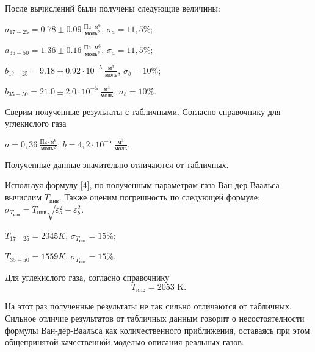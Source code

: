 \documentclass[a4paper,12pt]{article} %
\begin{document}
После вычислений были получены следующие величины:

\begin{center}
    $\displaystyle a_{17-25}= 0.78 \pm 0.09 \  \frac{\text{Па}\cdot \text{м}^6}{\text{моль}^2}$, $\displaystyle \sigma_{a} = 11,5 \%$; \break
    
    $\displaystyle a_{35-50}= 1.36 \pm 0.16 \  \frac{\text{Па}\cdot \text{м}^6}{\text{моль}^2}$, $\displaystyle \sigma_{a} = 11,5 \%$; \break

    $\displaystyle b_{17-25}= 9.18 \pm 0.92 \cdot 10^{-5} \ \frac{\text{м}^3}{\text{моль}}$, $\displaystyle \sigma_{b} = 10 \%$; \break
    
    $\displaystyle b_{35-50}= 21.0 \pm 2.0 \cdot 10^{-5} \ \frac{\text{м}^3}{\text{моль}}$, $\displaystyle \sigma_{b} = 10 \%$. \break
\end{center}

Сверим полученные результаты с табличными. Согласно справочнику для углекислого газа
\begin{center}
    
$\displaystyle a = 0,36 \  \frac{\text{Па}\cdot\text{м}^6}{\text{моль}^2}$; \break$\displaystyle b = 4,2\cdot 10^{-5} \ \frac{\text{м}^3}{\text{моль}}.$ 
\end{center}
Полученные данные значительно отличаются от табличных.

Используя формулу \eqref{4}, по полученным параметрам газа Ван-дер-Ваальса вычислим $ T_\text{инв} $. Также оценим погрешность по следующей формуле:
$\displaystyle \sigma_{T_\text{инв}} = T_\text{инв}\sqrt{\varepsilon^2_a+\varepsilon_b^2}.$

\begin{center}
    $\displaystyle T_{17-25} = 2045 K$, $\displaystyle \sigma_{T_{\text{инв}}} = 15\%$; \break
    
    $\displaystyle T_{35-50} = 1559 K$, $\displaystyle \sigma_{T_{\text{инв}}} = 15\%$.
\end{center}

Для углекислого газа, согласно справочнику  \[ T_\text{инв} = 2053 \text{ K}.\]

На этот раз полученные результаты не так сильно отличаются от табличных. Сильное отличие результатов от табличных данным говорит о несостоятелности формулы Ван-дер-Ваальса как количественного приближения, оставаясь при этом общепринятой качественной моделью описания реальных газов.
\end{document}
